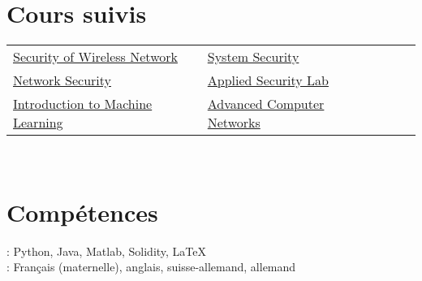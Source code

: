 \documentclass[mm]{simple_style}
\begin{document}
\begin{resume}
\section{Cours suivis}
    \begin{tabular}{lllll}
        \href{http://www.syssec.ethz.ch/education/sown/sown_AS16.html}{Security of Wireless Network} & \href{http://www.syssec.ethz.ch/education/system_security/system_security_as16.html}{System Security}\\
        \href{https://netsec.ethz.ch/courses/netsec-2016/}{Network Security} & \href{http://www.infsec.ethz.ch/education/as2016.html}{Applied Security Lab} \\
        \href{https://www.cs.cmu.edu/~10601b/}{Introduction to Machine Learning} & \href{https://ndal.ethz.ch/courses/acn.html}{Advanced Computer Networks}\\
    \end{tabular}\\
\sectionline
\section{Comp\'etences}
: Python, Java, Matlab, Solidity, \LaTeX\\
: Fran\c{c}ais (maternelle), anglais, suisse-allemand, allemand\\
\sectionline

\end{resume}
\end{document}
